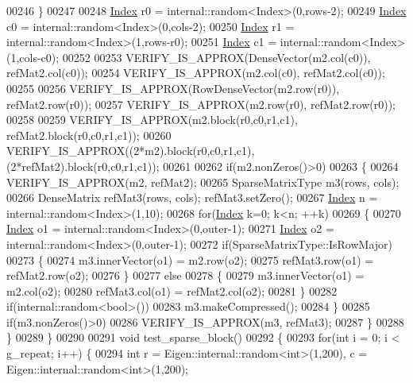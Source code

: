 \begin{DoxyCode}
00246     \}
00247     
00248     \hyperlink{namespace_eigen_a62e77e0933482dafde8fe197d9a2cfde}{Index} r0 = internal::random<Index>(0,rows-2);
00249     \hyperlink{namespace_eigen_a62e77e0933482dafde8fe197d9a2cfde}{Index} c0 = internal::random<Index>(0,cols-2);
00250     \hyperlink{namespace_eigen_a62e77e0933482dafde8fe197d9a2cfde}{Index} r1 = internal::random<Index>(1,rows-r0);
00251     \hyperlink{namespace_eigen_a62e77e0933482dafde8fe197d9a2cfde}{Index} c1 = internal::random<Index>(1,cols-c0);
00252     
00253     VERIFY\_IS\_APPROX(DenseVector(m2.col(c0)), refMat2.col(c0));
00254     VERIFY\_IS\_APPROX(m2.col(c0), refMat2.col(c0));
00255     
00256     VERIFY\_IS\_APPROX(RowDenseVector(m2.row(r0)), refMat2.row(r0));
00257     VERIFY\_IS\_APPROX(m2.row(r0), refMat2.row(r0));
00258 
00259     VERIFY\_IS\_APPROX(m2.block(r0,c0,r1,c1), refMat2.block(r0,c0,r1,c1));
00260     VERIFY\_IS\_APPROX((2*m2).block(r0,c0,r1,c1), (2*refMat2).block(r0,c0,r1,c1));
00261 
00262     \textcolor{keywordflow}{if}(m2.nonZeros()>0)
00263     \{
00264       VERIFY\_IS\_APPROX(m2, refMat2);
00265       SparseMatrixType m3(rows, cols);
00266       DenseMatrix refMat3(rows, cols); refMat3.setZero();
00267       \hyperlink{namespace_eigen_a62e77e0933482dafde8fe197d9a2cfde}{Index} n = internal::random<Index>(1,10);
00268       \textcolor{keywordflow}{for}(\hyperlink{namespace_eigen_a62e77e0933482dafde8fe197d9a2cfde}{Index} k=0; k<n; ++k)
00269       \{
00270         \hyperlink{namespace_eigen_a62e77e0933482dafde8fe197d9a2cfde}{Index} o1 = internal::random<Index>(0,outer-1);
00271         \hyperlink{namespace_eigen_a62e77e0933482dafde8fe197d9a2cfde}{Index} o2 = internal::random<Index>(0,outer-1);
00272         \textcolor{keywordflow}{if}(SparseMatrixType::IsRowMajor)
00273         \{
00274           m3.innerVector(o1) = m2.row(o2);
00275           refMat3.row(o1) = refMat2.row(o2);
00276         \}
00277         \textcolor{keywordflow}{else}
00278         \{
00279           m3.innerVector(o1) = m2.col(o2);
00280           refMat3.col(o1) = refMat2.col(o2);
00281         \}
00282         \textcolor{keywordflow}{if}(internal::random<bool>())
00283           m3.makeCompressed();
00284       \}
00285       \textcolor{keywordflow}{if}(m3.nonZeros()>0)
00286       VERIFY\_IS\_APPROX(m3, refMat3);
00287     \}
00288   \}
00289 \}
00290 
00291 \textcolor{keywordtype}{void} test\_sparse\_block()
00292 \{
00293   \textcolor{keywordflow}{for}(\textcolor{keywordtype}{int} i = 0; i < g\_repeat; i++) \{
00294     \textcolor{keywordtype}{int} r = Eigen::internal::random<int>(1,200), c = Eigen::internal::random<int>(1,200);

\end{DoxyCode}
